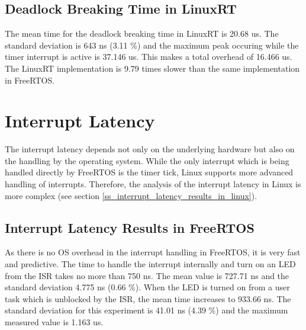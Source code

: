 \subsection{Deadlock Breaking Time in LinuxRT}
The mean time for the deadlock breaking time in LinuxRT is 20.68 us. 
The standard deviation is 643 ns (3.11 \%) and the maximum peak occuring while the timer interrupt is active is 37.146 us.
This makes a total overhead of 16.466 us.
The LinuxRT implementation is 9.79 times slower than the same implementation in FreeRTOS.
 
\section{Interrupt Latency}\label{s_interrup_latency} 
The interrupt latency depends not only on the underlying hardware but also on the handling by the operating system.
While the only interrupt which is being handled directly by FreeRTOS is the timer tick, Linux supports more advanced handling of interrupts. 
Therefore, the analysis of the interrupt latency in Linux is more complex (see section \ref{ss_interrupt_latency_results_in_linux}).



\subsection{Interrupt Latency Results in FreeRTOS}
As there is no \ac{OS} overhead in the interrupt handling in FreeRTOS, it is very fast and predictive.
The time to handle the interrupt internally and turn on an \ac{LED} from the \ac{ISR} takes no more than 750 ns. 
The mean value is 727.71 ns and the standard deviation 4.775 ns (0.66 \%). 
When the \ac{LED} is turned on from a user task which is unblocked by the \ac{ISR}, the mean time increases to 933.66 ns.
The standard deviation for this experiment is 41.01 ns (4.39 \%) and the maximum measured value is 1.163 us.
  

